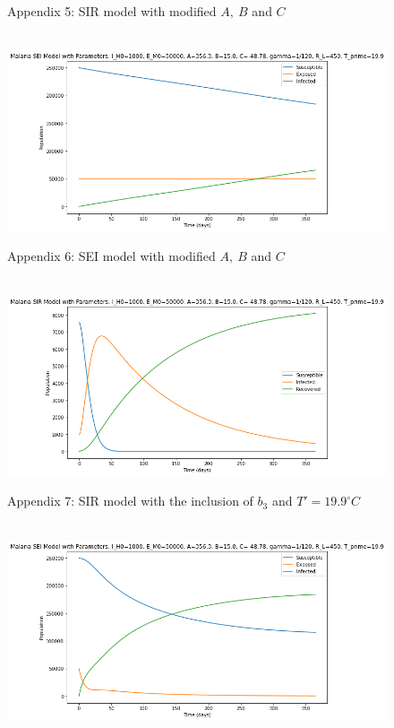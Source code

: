\documentclass[
	12pt,				%
	oneside,			%
	a4paper,			%
	english,			%
	brazil				%
	]{abntex2}
\begin{document}
\begin{apendicesenv}
\begin{figure}[!ht]
	\caption*{Appendix 5: SIR model with modified $A, \ B$ and $C$}
\end{figure} 
\begin{figure}[!ht]
	\centering
	\hbox{\hspace{2.0em} \includegraphics[scale=0.55] {THESIS-SEI_Aumenta_ABC_CORRECAO.png}}
	\caption*{Appendix 6: SEI model with modified $A, \ B$ and $C$}
\end{figure}
\newpage
\begin{figure}[!ht]
	\centering
	\hbox{\hspace{0.8em} \includegraphics[scale=0.55] {THESIS-SIR_Correcao_b3_T_linha_19_9.png}}
	\caption*{Appendix 7: SIR model with the inclusion of $b_3$ and $T'=19.9^\circ C$}
\end{figure} 
\begin{figure}[!ht]
	\centering
	\hbox{\hspace{0.8em} \includegraphics[scale=0.55] {THESIS-SEI_Correcao_b3_T_linha_19_9.png}}

\end{figure}
\end{apendicesenv}
\end{document}
